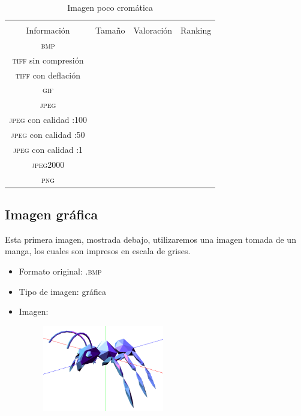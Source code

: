 \documentclass[11pt,a4paper]{article}
\begin{document}
\begin{table}[H]
\centering
\begin{tabular}{|c|c|c|c|}
\hline
\diagbox[width=15em]{\textit{Códec}/Formato}{\\Información} & Tamaño & Valoración & Ranking \\
\hline
\textsc{bmp} &  &  &  \\ \hline
\textsc{tiff} sin compresión &  &  &  \\ \hline
\textsc{tiff} con deflación &  &  &  \\ \hline
\textsc{gif} &  &  &  \\ \hline
\textsc{jpeg} &  &  &  \\ \hline
\textsc{jpeg} con calidad :100 &  &  &  \\ \hline
\textsc{jpeg} con calidad :50 &  &  &  \\ \hline
\textsc{jpeg} con calidad :1 &  &  &  \\ \hline
\textsc{jpeg2000} &  &  &  \\ \hline
\textsc{png} &  &  &  \\ \hline
\end{tabular}
\caption{Imagen poco cromática}
\label{tab:my-table}
\end{table}


\subsection{Imagen gráfica}

Esta primera imagen, mostrada debajo, utilizaremos una imagen tomada de un manga, los cuales son impresos en escala de grises.

\begin{itemize}
	\item Formato original: \textsc{.bmp}
	\item Tipo de imagen: gráfica
	\item Imagen:
		\begin{figure}[H]
		\centering
			\includegraphics[width=0.5\textwidth]{Fotos/graficos.bmp}
		\end{figure}	
\end{itemize}
\end{document}
